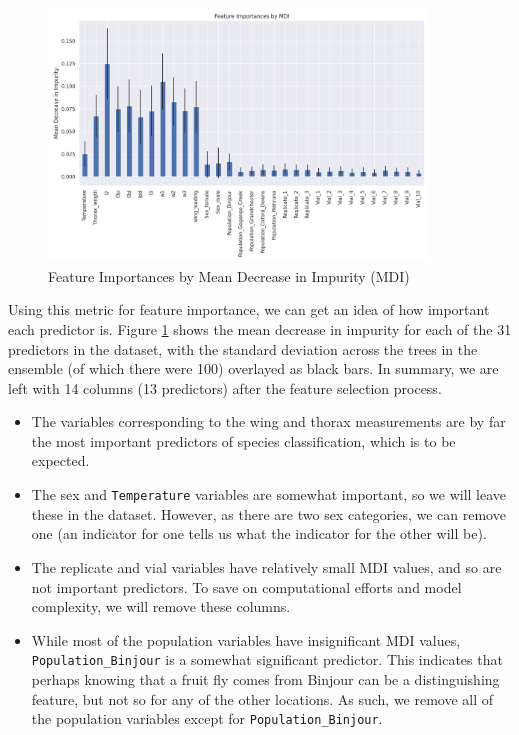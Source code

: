 \begin{figure}[ht]
\begin{center}
\includegraphics[width=0.9\textwidth]{fig/mdi_feature_importances.png}
\end{center}
\caption{Feature Importances by Mean Decrease in Impurity (MDI)}
\label{featureimportancesmdi}
\end{figure}

Using this metric for feature importance, we can get an idea of how important each predictor is. Figure \ref{featureimportancesmdi} shows the mean decrease in impurity for each of the 31 predictors in the dataset, with the standard deviation across the trees in the ensemble (of which there were 100) overlayed as black bars. In summary, we are left with 14 columns (13 predictors) after the feature selection process.

\begin{itemize}
    \item The variables corresponding to the wing and thorax measurements are by far the most important predictors of species classification, which is to be expected.
    \item The sex and \texttt{Temperature} variables are somewhat important, so we will leave these in the dataset. However, as there are two sex categories, we can remove one (an indicator for one tells us what the indicator for the other will be).
    \item The replicate and vial variables have relatively small MDI values, and so are not important predictors. To save on computational efforts and model complexity, we will remove these columns.
    \item While most of the population variables have insignificant MDI values, \texttt{Population\_Binjour} is a somewhat significant predictor. This indicates that perhaps knowing that a fruit fly comes from Binjour can be a distinguishing feature, but not so for any of the other locations. As such, we remove all of the population variables except for \texttt{Population\_Binjour}.
\end{itemize}


